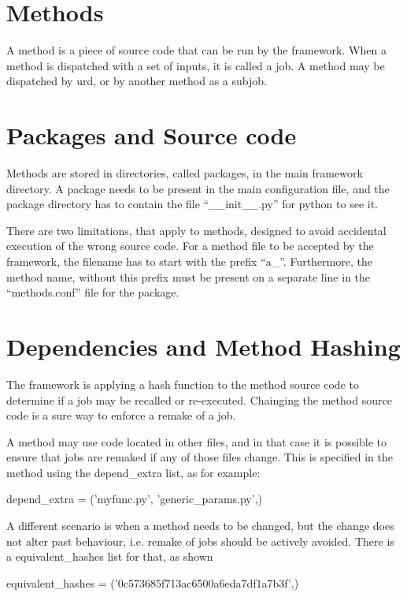 \section{Methods}

A method is a piece of source code that can be run by the framework.
When a method is dispatched with a set of inputs, it is called a job.
A method may be dispatched by urd, or by another method as a subjob.



\section{Packages and Source code}

Methods are stored in directories, called packages, in the main
framework directory.  A package needs to be present in the main
configuration file, and the package directory has to contain the file
``\_\_init\_\_.py'' for python to see it.

There are two limitations, that apply to methods, designed to avoid
accidental execution of the wrong source code.  For a method file to
be accepted by the framework, the filename has to start with the
prefix ``a\_''.  Furthermore, the method name, without this prefix must
be present on a separate line in the ``methods.conf'' file for the
package.



\section{Dependencies and Method Hashing}

The framework is applying a hash function to the method source code to
determine if a job may be recalled or re-executed.  Chainging the
method source code is a sure way to enforce a remake of a job.

A method may use code located in other files, and in that case it is
possible to ensure that jobs are remaked if any of those files change.
This is specified in the method using the depend\_extra list, as for
example:

\begin{python}
depend_extra = ('myfunc.py', 'generic_params.py',)
\end{python}

A different scenario is when a method needs to be changed, but the
change does not alter past behaviour, i.e. remake of jobs should be
actively avoided.  There is a equivalent\_hashes list for that, as
shown
\begin{python}
  equivalent_hashes = ('0c573685f713ac6500a6eda7df1a7b3f',)
\end{python}




